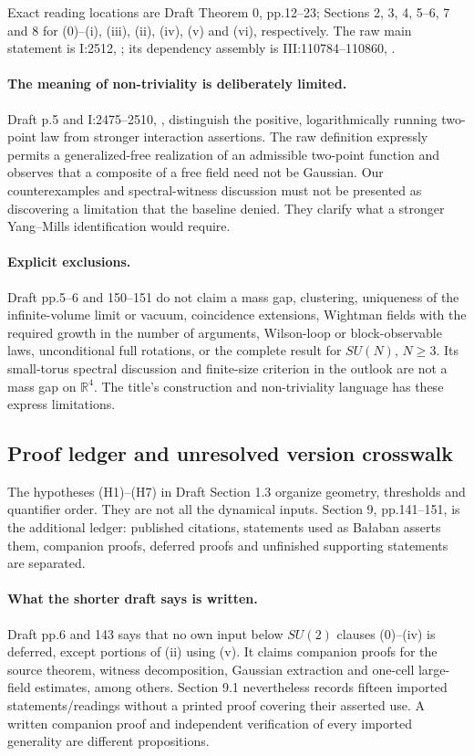 Exact reading locations are Draft Theorem 0, pp.12--23;
Sections 2, 3, 4, 5--6, 7 and 8 for (0)--(i), (iii),
(ii), (iv), (v) and (vi), respectively. The raw main
statement is I:2512, ; its dependency
assembly is III:110784--110860, .

\paragraph{The meaning of non-triviality is deliberately limited.}
Draft p.5 and I:2475--2510,
, distinguish the positive,
logarithmically running two-point law from stronger
interaction assertions. The raw definition expressly
permits a generalized-free realization of an admissible
two-point function and observes that a composite of a free
field need not be Gaussian. Our counterexamples and
spectral-witness discussion must not be presented as
discovering a limitation that the baseline denied.
They clarify what a stronger Yang--Mills identification
would require.

\paragraph{Explicit exclusions.}
Draft pp.5--6 and 150--151 do not claim a mass gap,
clustering, uniqueness of the infinite-volume limit or
vacuum, coincidence extensions, Wightman fields with the
required growth in the number of arguments, Wilson-loop
or block-observable laws, unconditional full rotations,
or the complete result for \(SU(N)\), \(N\geq3\).
Its small-torus spectral discussion and finite-size
criterion in the outlook are not a mass gap on
\(\mathbb R^4\). The title's construction and
non-triviality language has these express limitations.

\subsection{Proof ledger and unresolved version crosswalk}
\label{hrb-ledger}

The hypotheses (H1)--(H7) in Draft Section 1.3 organize
geometry, thresholds and quantifier order. They are not
all the dynamical inputs. Section 9, pp.141--151, is the
additional ledger: published citations, statements used
as Ba{\l}aban asserts them, companion proofs, deferred
proofs and unfinished supporting statements are separated.

\paragraph{What the shorter draft says is written.}
Draft pp.6 and 143 says that no own input below \(SU(2)\)
clauses (0)--(iv) is deferred, except portions of (ii)
using (v). It claims companion proofs for the source
theorem, witness decomposition, Gaussian extraction and
one-cell large-field estimates, among others.
Section 9.1 nevertheless records fifteen imported
statements/readings without a printed proof covering
their asserted use. A written companion proof and
independent verification of every imported generality
are different propositions.


